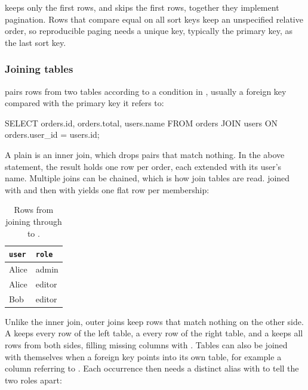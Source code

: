  keeps only the first  rows,
and  skips the first  rows,
together they implement pagination.
Rows that compare equal on all sort keys keep an unspecified relative order,
so reproducible paging needs a unique key, typically the primary key, as the last sort key.

\subsubsection{Joining tables}

 pairs rows from two tables according to a condition in ,
usually a foreign key compared with the primary key it refers to:

\begin{sqlblock}
SELECT orders.id, orders.total, users.name
FROM orders
JOIN users ON orders.user_id = users.id;
\end{sqlblock}

A plain  is an inner join, which drops pairs that match nothing.
In the above statement, the result holds one row per order,
each extended with its user's name.
Multiple joins can be chained, which is how join tables are read.
 joined with  and then with 
yields one flat row per membership:

\begin{table}[H]
	\centering
	\begin{tabular}{|l|l|}
		\hline
		\texttt{user} & \texttt{role} \\
		\hline
		Alice         & admin         \\
		Alice         & editor        \\
		Bob           & editor        \\
		\hline
	\end{tabular}
	\caption{Rows from joining  through  to .}
	\label{tab:memberships}
\end{table}

Unlike the inner join, outer joins keep rows
that match nothing on the other side.
A  keeps every row of the left table,
a  every row of the right table,
and a  keeps all rows from both sides,
filling missing columns with .
Tables can also be joined with themselves
when a foreign key points into its own table,
for example a  column referring to .
Each occurrence then needs a distinct alias
with  to tell the two roles apart:


